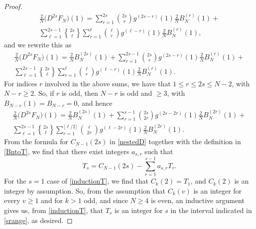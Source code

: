 \documentclass[10pt,a4paper]{amsart}
\DeclareRobustCommand{\stirling}{\genfrac\{\}{0pt}{}}
\begin{document}
\begin{proof}
\begin{multline*}
 \frac{2}{N} \big( D^{2s} F_{N} \big)(1) = \sum_{r=1}^{2s} \binom{2s}{r} g^{(2s - r)}(1) \frac{2}{N} B_{N}^{(r)}(1) + \\ 
 \sum_{\ell = 1}^{2s-1} \stirling{2s}{\ell} \sum_{r=1}^{\ell} \binom{\ell}{r} g^{(\ell - r)}(1) \frac{2}{N} B_{N}^{(r)}(1), 
\end{multline*}
 and we rewrite this as 
\begin{multline*}
 \frac{2}{N} \big( D^{2s} F_{N} \big)(1) = \frac{2}{N} B_{N}^{(2s)}(1) + \sum_{r=1}^{2s-1} \binom{2s}{r} g^{(2s - r)}(1) \frac{2}{N} B_{N}^{(r)}(1) 
 + \\ 
 \sum_{\ell = 1}^{2s-1} \stirling{2s}{\ell} \sum_{r=1}^{\ell} \binom{\ell}{r} g^{(\ell - r)}(1) \frac{2}{N} B_{N}^{(r)}(1). 
\end{multline*}
 For indices $r$ involved in the above sums, we have that $1 \leq r \leq 2s \leq N-2$, 
 with $N - r \geq 2$. So, if $r$ is odd, then $N - r$ is odd and $\geq 3$, 
 with $B_{N-r}(1) = B_{N - r} = 0$, and hence
\begin{multline*}
 \frac{2}{N} \big( D^{2s} F_{N} \big)(1) = \frac{2}{N} B_{N}^{(2s)}(1) + \sum_{r=1}^{s-1} \binom{2s}{2r} g^{(2s - 2r)}(1) \frac{2}{N} B_{N}^{(2r)}(1) 
 + \\ 
 \sum_{\ell = 1}^{2s-1} \stirling{2s}{\ell} \sum_{ r = 1 }^{ \lfloor {\ell}/{2} \rfloor} \binom{\ell}{2r} g^{(\ell - 2r)}(1) \frac{2}{N} B_{N}^{(2r)}(1). 
\end{multline*}
 From the formula for $C_{N - 1}(2s)$ in \eqref{nestedD} together with the definition in \eqref{BntoT}, we find that there exist integers 
 $a_{s, r}$ such that 
\begin{equation}\label{inductionT} 
 T_{s} = C_{N-1}(2s) - \sum_{r=1}^{s-1} a_{s, r} T_{r}. 
\end{equation}
 For the $s = 1$ case of \eqref{inductionT}, we find that $C_{k}(2) = T_{1}$, and $C_{k}(2) $ is an integer by assumption. So, from the 
 assumption that $C_{k}(v)$ is an integer for every $v \geq 1$ and for $k > 1$ odd, and since $N \geq 4$ is even,  an inductive argument 
 gives us, from  \eqref{inductionT}, that $T_{s}$ is an integer for 
 $s$ in the interval indicated in \eqref{srange}, 
 as desired. 
\end{proof}
\end{document}
